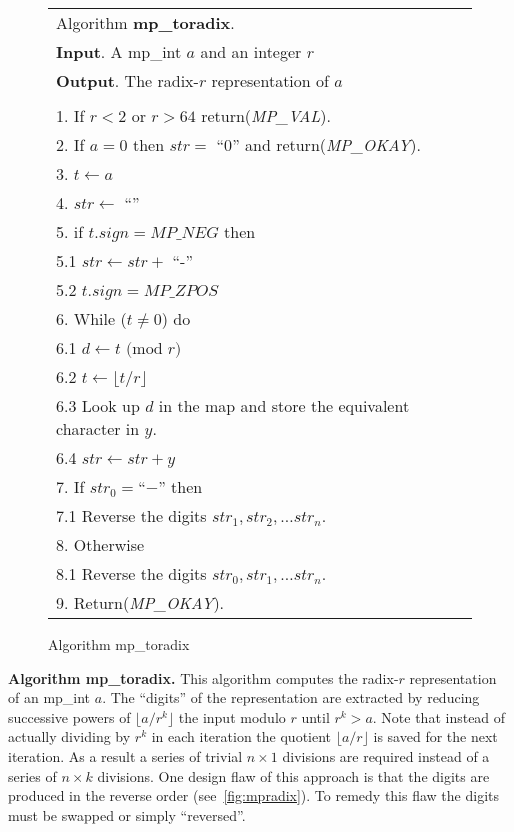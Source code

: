 \documentclass[b5paper]{book}
\begin{document}
\newpage\begin{figure}[!here]
\begin{small}
\begin{center}
\begin{tabular}{l}
\hline Algorithm \textbf{mp\_toradix}. \\
\textbf{Input}.   A mp\_int $a$ and an integer $r$\\
\textbf{Output}.  The radix-$r$ representation of $a$ \\
\hline \\
1.  If $r < 2$ or $r > 64$ return(\textit{MP\_VAL}). \\
2.  If $a = 0$ then $str = $ ``$0$'' and return(\textit{MP\_OKAY}).  \\
3.  $t \leftarrow a$ \\
4.  $str \leftarrow$ ``'' \\
5.  if $t.sign = MP\_NEG$ then \\
\hspace{3mm}5.1  $str \leftarrow str + $ ``-'' \\
\hspace{3mm}5.2  $t.sign = MP\_ZPOS$ \\
6.  While ($t \ne 0$) do \\
\hspace{3mm}6.1  $d \leftarrow t \mbox{ (mod }r\mbox{)}$ \\
\hspace{3mm}6.2  $t \leftarrow \lfloor t / r \rfloor$ \\
\hspace{3mm}6.3  Look up $d$ in the map and store the equivalent character in $y$. \\
\hspace{3mm}6.4  $str \leftarrow str + y$ \\
7.  If $str_0 = $``$-$'' then \\
\hspace{3mm}7.1  Reverse the digits $str_1, str_2, \ldots str_n$. \\
8.  Otherwise \\
\hspace{3mm}8.1  Reverse the digits $str_0, str_1, \ldots str_n$. \\
9.  Return(\textit{MP\_OKAY}).\\
\hline
\end{tabular}
\end{center}
\end{small}
\caption{Algorithm mp\_toradix}
\end{figure}
\textbf{Algorithm mp\_toradix.}
This algorithm computes the radix-$r$ representation of an mp\_int $a$.  The ``digits'' of the representation are extracted by reducing 
successive powers of $\lfloor a / r^k \rfloor$ the input modulo $r$ until $r^k > a$.  Note that instead of actually dividing by $r^k$ in
each iteration the quotient $\lfloor a / r \rfloor$ is saved for the next iteration.  As a result a series of trivial $n \times 1$ divisions
are required instead of a series of $n \times k$ divisions.  One design flaw of this approach is that the digits are produced in the reverse order 
(see~\ref{fig:mpradix}).  To remedy this flaw the digits must be swapped or simply ``reversed''.
\end{document}
